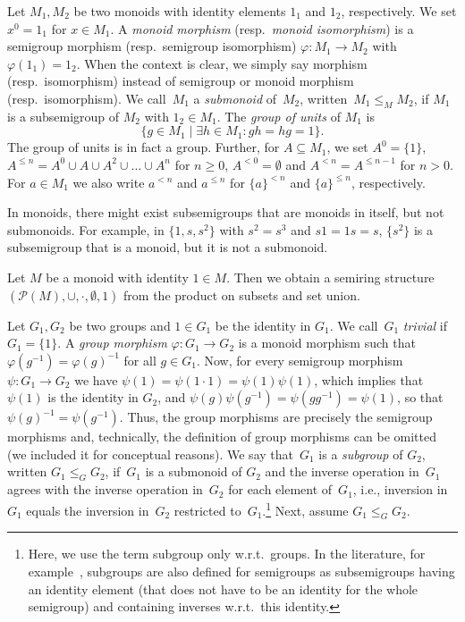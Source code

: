 \label{def:submonoid} 
\label{def:powers-smaller}
\label{def:group of units} 
Let $M_1, M_2$ be two monoids with identity elements $1_1$ and $1_2$, respectively.
We set $x^0 = 1_1$ for $x \in M_1$.
A \emph{monoid morphism} (resp.~\emph{monoid isomorphism}) is a 
semigroup morphism (resp.~semigroup isomorphism) $\varphi \colon M_1 \to M_2$
with $\varphi(1_1) = 1_2$.
When the context is clear, we simply say morphism (resp.~isomorphism) instead
of semigroup or monoid morphism (resp.~isomorphism).
We call~$M_1$ a \emph{submonoid} 
of~$M_2$, written~$M_1 \le_M M_2$, if $M_1$ is a subsemigroup of $M_2$ with $1_2 \in M_1$.
The \emph{group of units} 
of $M_1$ 
is
\[ 
\{ g \in M_1 \mid \exists h \in M_1 : gh = hg = 1 \}.
\] 
The group of units is in fact a group.
Further, for $A \subseteq M_1$,  we set 
$A^0 = \{1\}$, $A^{\le n} = A^0 \cup A \cup A^2 \cup \ldots \cup A^n$ 
for $n \ge 0$, $A^{< 0} = \emptyset$ and $A^{< n} = A^{\le n - 1}$ for $n > 0$. 
For $a \in M_1$ we also write $a^{< n}$ and $a^{\le n}$ for $\{a\}^{< n}$ and $\{a\}^{\le n}$, respectively.

\begin{remark} In monoids, there might exist subsemigroups that are monoids in itself, but not submonoids.	
	For example, in $\{1,s,s^2\}$ with $s^2 = s^3$ and $s1 = 1s = s$, $\{ s^2 \}$ is a subsemigroup
	that is a monoid, but it is not a submonoid.
\end{remark} 

\begin{example}
	Let $M$ be a monoid with identity $1 \in M$.
	Then we 
	obtain a semiring structure~$(\mathcal P(M), \cup, \cdot, \emptyset, 1)$
	from the product on subsets and set union.	
\end{example}

\label{def:subgroup}
Let $G_1, G_2$ be two groups and $1 \in G_1$ be the identity in $G_1$.
We call~$G_1$ \emph{trivial} 
if $G_1 = \{1\}$.
A \emph{group morphism} $\varphi \colon G_1 \to G_2$
is a monoid morphism such that $\varphi(g^{-1}) = \varphi(g)^{-1}$
for all $g \in G_1$.
Now, for every semigroup morphism $\psi \colon G_1 \to G_2$
we have $\psi(1) = \psi(1\cdot 1) = \psi(1)\psi(1)$,
which implies that $\psi(1)$ is the identity in $G_2$,
and $\psi(g)\psi(g^{-1}) = \psi(gg^{-1}) = \psi(1)$,
so that $\psi(g)^{-1} = \psi(g^{-1})$. Thus, the group morphisms
are precisely the semigroup morphisms
and, technically, 
the definition of group morphisms can be omitted (we included it for conceptual reasons).
We say that~$G_1$ is a \emph{subgroup}
of $G_2$, written $G_1 \le_G G_2$,
if~$G_1$ is a submonoid of $G_2$ and the inverse operation in~$G_1$
agrees with the inverse operation in~$G_2$ for each element of~$G_1$, i.e.,
inversion in~$G_1$ equals the inversion in~$G_2$ restricted to~$G_1$.\footnote{Here, we use the term subgroup only
	w.r.t.~groups. In the literature, for example~\cite{McNaughton71}, 
	subgroups are also defined for semigroups as subsemigroups
	having an identity element (that does not have to be an identity for the whole semigroup)
	and containing inverses w.r.t.~this identity.}
Next, assume $G_1 \le_G G_2$. 

